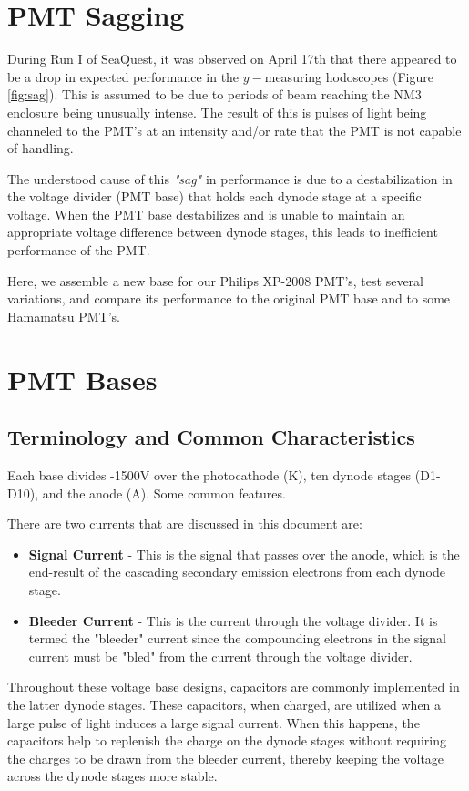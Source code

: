 \documentclass[11pt]{article}
\begin{document}
\section{PMT Sagging}

During Run I of SeaQuest, it was observed on April 17th that there appeared to be a drop in expected performance in the $y-$measuring hodoscopes (Figure \ref{fig:sag}). This is assumed to be due to periods of beam reaching the NM3 enclosure being unusually intense. The result of this is pulses of light being channeled to the PMT's at an intensity and/or rate that the PMT is not capable of handling.

The understood cause of this \emph{"sag"} in performance is due to a destabilization in the voltage divider (PMT base) that holds each dynode stage at a specific voltage. When the PMT base destabilizes and is unable to maintain an appropriate voltage difference between dynode stages, this leads to inefficient performance of the PMT.

Here, we assemble a new base for our Philips XP-2008 PMT's, test several variations, and compare its performance to the original PMT base and to some Hamamatsu PMT's.

\section{PMT Bases}

\subsection{Terminology and Common Characteristics}

Each base divides -1500V over the photocathode (K), ten dynode stages (D1-D10), and the anode (A). Some common features.

There are two currents that are discussed in this document are:
\begin{itemize}
\item \textbf{Signal Current} - This is the signal that passes over the anode, which is the end-result of the cascading secondary emission electrons from each dynode stage.
\item \textbf{Bleeder Current} - This is the current through the voltage divider. It is termed the "bleeder" current since the compounding electrons in the signal current must be "bled" from the current through the voltage divider.
\end{itemize}

Throughout these voltage base designs, capacitors are commonly implemented in the latter dynode stages. These capacitors, when charged, are utilized when a large pulse of light induces a large signal current.  When this happens, the capacitors help to replenish the charge on the dynode stages without requiring the charges to be drawn from the bleeder current, thereby keeping the voltage across the dynode stages more stable.
\end{document}
